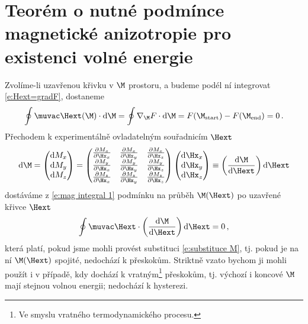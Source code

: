 \section{Teorém o nutné podmínce magnetické anizotropie pro existenci volné energie}\label{k:dodatek volna energie}



Zvolíme-li uzavřenou křivku v $\M$ prostoru, a budeme podél ní integrovat \eqref{e:Hext=gradF}, dostaneme
\begin{equation} \label{e:mag integral 1}
\oint \muvac\Hext(\M) \cdot \text{d}\M = \oint \nabla_{\M} F \cdot \text{d}\M = F(\M_\textrm{start})-F(\M_\textrm{end})=0 \,.
\end{equation}
Přechodem k experimentálně ovladatelným souřadnicím $\Hext$
\begin{equation} \label{e:substituce M}
\text{d}\M=\begin{pmatrix}\text{d}M_x \\ \text{d}M_y \\ \text{d}M_z \end{pmatrix}
=\begin{pmatrix}
\frac{\partial M_x}{\partial \Hx_x} & \frac{\partial M_x}{\partial \Hx_y} & \frac{\partial M_x}{\partial \Hx_z} \\
\frac{\partial M_y}{\partial \Hx_x} & \frac{\partial M_y}{\partial \Hx_y} & \frac{\partial M_y}{\partial \Hx_z} \\
\frac{\partial M_z}{\partial \Hx_x} & \frac{\partial M_z}{\partial \Hx_y} & \frac{\partial M_z}{\partial \Hx_z} \\
\end{pmatrix}
\begin{pmatrix}\text{d}\Hx_x \\ \text{d}\Hx_y \\ \text{d}\Hx_z \end{pmatrix}
\equiv\left( \frac{\text{d}\M}{\text{d}\Hext} \right) \text{d}\Hext
\end{equation}
dostáváme z \eqref{e:mag integral 1} podmínku na průběh $\M(\Hext)$ po uzavřené křivce $\Hext$ 
\begin{equation}
\oint \muvac\Hext \cdot \left( \frac{\text{d}\M}{\text{d}\Hext} \right) \text{d}\Hext = 0 \,,
\end{equation}
která platí, pokud jsme mohli provést substituci \eqref{e:substituce M}, tj. pokud je na ní $\M(\Hext)$ spojité, nedochází k přeskokům.
Striktně vzato bychom ji mohli použít i v případě, kdy dochází k vratným\footnote{Ve smyslu vratného termodynamického procesu.} přeskokům, tj. výchozí i koncové $\M$ mají stejnou volnou energii; nedochází k hysterezi.


